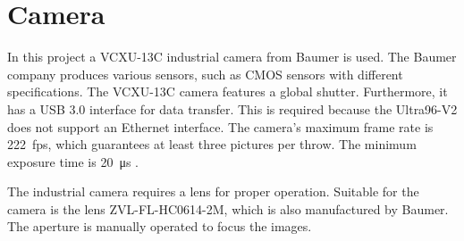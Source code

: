\section{Camera}
\label{sec:hardware:camera}

In this project a VCXU-13C industrial camera from Baumer is used.
The Baumer company produces various sensors, such as CMOS sensors with different specifications.
The VCXU-13C camera features a global shutter.
Furthermore, it has a USB 3.0 interface for data transfer.
This is required because the Ultra96-V2 does not support an Ethernet interface.
The camera's maximum frame rate is \SI{222}{fps}, which guarantees at least three pictures per throw.
The minimum exposure time is \SI{20}{\micro s} \cite{baumer_cam}.

The industrial camera requires a lens for proper operation.
Suitable for the camera is the lens ZVL-FL-HC0614-2M, which is also manufactured by Baumer.
The aperture is manually operated to focus the images.
